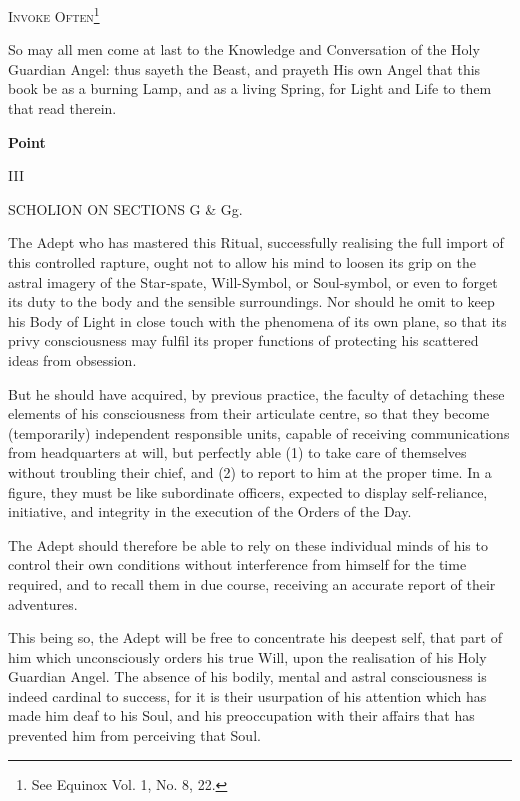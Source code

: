 {
\centering
\Large
\textsc{Invoke Often}\footnote{See Equinox Vol. 1, No. 8, 22.\footnotemark}
\par
}


So may all men come at last to the Knowledge and Conversation of the Holy Guardian Angel: thus sayeth the Beast, and prayeth His own Angel that this book be as a burning Lamp, and as a living Spring, for Light and Life to them that read therein.


{
\par
}

\pagebreak

\begin{center}
\textbf{Point}

III

SCHOLION ON SECTIONS G \& Gg.
\end{center}


The Adept who has mastered this Ritual, successfully realising the full import of this controlled rapture, ought not to allow his mind to loosen its grip on the astral imagery of the Star-spate, Will-Symbol, or Soul-symbol, or even to forget its duty to the body and the sensible surroundings. Nor should he omit to keep his Body of Light in close touch with the phenomena of its own plane, so that its privy consciousness may fulfil its proper functions of protecting his scattered ideas from obsession.

But he should have acquired, by previous practice, the faculty of detaching these elements of his consciousness from their articulate centre, so that they become (temporarily) independent responsible units, capable of receiving communications from headquarters at will, but perfectly able (1) to take care of themselves without troubling their chief, and (2) to report to him at the proper time. In a figure, they must be like subordinate officers, expected to display self-reliance, initiative, and integrity in the execution of the Orders of the Day.

The Adept should therefore be able to rely on these individual minds of his to control their own conditions without interference from himself for the time required, and to recall them in due course, receiving an accurate report of their adventures.

This being so, the Adept will be free to concentrate his deepest self, that part of him which unconsciously orders his true Will, upon the realisation of his Holy Guardian Angel. The absence of his bodily, mental and astral consciousness is indeed cardinal to success, for it is their usurpation of his attention which has made him deaf to his Soul, and his preoccupation with their affairs that has prevented him from perceiving that Soul.

